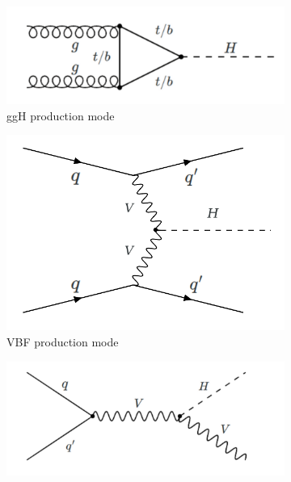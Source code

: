 \begin{figure}[h]
    \centering
    \begin{subfigure}{0.55\textwidth}
    \includegraphics[width=\textwidth]{images/ggh.png}
    \caption{ggH production mode}
    \label{ggf_feynman}
    \end{subfigure}
    \hfill
    \begin{subfigure}{0.3\textwidth}
    \includegraphics[width=\textwidth]{images/vbf.png}
    \caption{VBF production mode}
    \label{vbf_feynman}
    \end{subfigure}\vspace{5pt}
    \begin{subfigure}{0.55\textwidth}
    \includegraphics[width=\textwidth]{images/vh.png}

\end{subfigure}
\end{figure}
